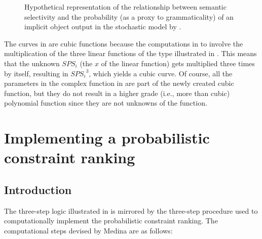 \begin{figure}[htb]
\caption{Hypothetical representation of the relationship between semantic selectivity and the probability (as a proxy to grammaticality) of an implicit object output in the stochastic model by \textcite{Medina2007}. }
\end{figure}

The curves in  are cubic functions because the computations in  to  involve the multiplication of the three linear functions of the type illustrated in . This means that the unknown $SPS_i$ (the $x$ of the linear function) gets multiplied three times by itself, resulting in ${SPS_i}^3$, which yields a cubic curve. Of course, all the parameters in the complex function in  are part of the newly created cubic function, but they do not result in a higher grade (i.e., more than cubic) polynomial function since they are not unknowns of the function.

\section{Implementing a probabilistic constraint ranking} 

\subsection{Introduction} 
The three-step logic illustrated in  is mirrored by the three-step procedure used to computationally implement the probabilistic constraint ranking. The computational steps devised by Medina are as follows: 


